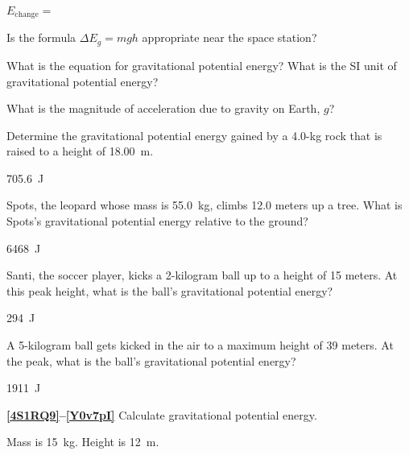 \documentclass[]{exam}
\begin{document}
\begin{questions}
\begin{parts}
\bigskip

$E_\mathrm{change} = $ \fillin[88.55]

\bigskip

Is the formula $\Delta E_g = mgh$ appropriate near the space station?

\end{parts}

\begin{center}
    
\end{center}

\question \label{xxSTEr}
What is the equation for gravitational potential energy? What is the SI unit of gravitational potential energy?


\question
What is the magnitude of acceleration due to gravity on Earth, $g$?


\question \label{9p9meZ}
Determine the gravitational potential energy gained by a 4.0-kg rock that is raised to a height of \SI{18.00}{m}.

\begin{solution}
\SI{705.6}{J}
\end{solution}


\question \label{i6NTnH}
Spots, the leopard whose mass is \SI{55.0}{kg}, climbs 12.0 meters up a tree. What is Spots's gravitational potential energy relative to the ground?

\begin{solution}
\SI{6468}{J}
\end{solution}

\question \label{FAhPt5}
Santi, the soccer player, kicks a 2-kilogram ball up to a height of 15 meters. At this peak height, what is the ball's gravitational potential energy?

\begin{solution}
\SI{294}{J}
\end{solution}


\question \label{Nn51QC}
A 5-kilogram ball gets kicked in the air to a maximum height of 39 meters. At the peak, what is the ball's gravitational potential energy?

\begin{solution}
\SI{1911}{J}
\end{solution}

\textbf{\ref{4S1RQ9}--\ref{Y0v7pI}} Calculate gravitational potential energy.

\question \label{4S1RQ9}
Mass is \SI{15}{kg}. Height is \SI{12}{m}.


\end{questions}
\end{document}
